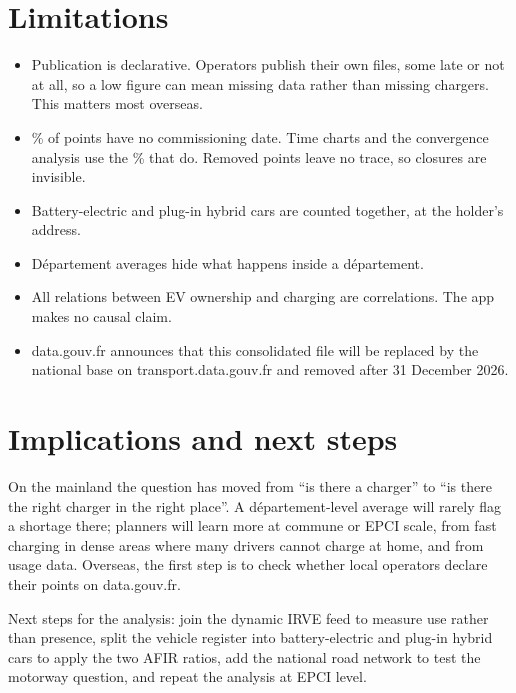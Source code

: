 \documentclass[11pt]{article}
\begin{document}
\section{Limitations}

\begin{itemize}
  \item Publication is declarative. Operators publish their own files, some late or not at all, so a low figure can mean missing data rather than missing chargers. This matters most overseas.
  \item \nDateMissingPct\% of points have no commissioning date. Time charts and the convergence analysis use the \nDatedPct\% that do. Removed points leave no trace, so closures are invisible.
  \item Battery-electric and plug-in hybrid cars are counted together, at the holder's address.
  \item Département averages hide what happens inside a département.
  \item All relations between EV ownership and charging are correlations. The app makes no causal claim.
  \item data.gouv.fr announces that this consolidated file will be replaced by the national base on transport.data.gouv.fr and removed after 31 December 2026.
\end{itemize}

\section{Implications and next steps}

On the mainland the question has moved from ``is there a charger'' to ``is there the right charger in the right place''. A département-level average will rarely flag a shortage there; planners will learn more at commune or EPCI scale, from fast charging in dense areas where many drivers cannot charge at home, and from usage data. Overseas, the first step is to check whether local operators declare their points on data.gouv.fr.

Next steps for the analysis: join the dynamic IRVE feed to measure use rather than presence, split the vehicle register into battery-electric and plug-in hybrid cars to apply the two AFIR ratios, add the national road network to test the motorway question, and repeat the analysis at EPCI level.
\end{document}
